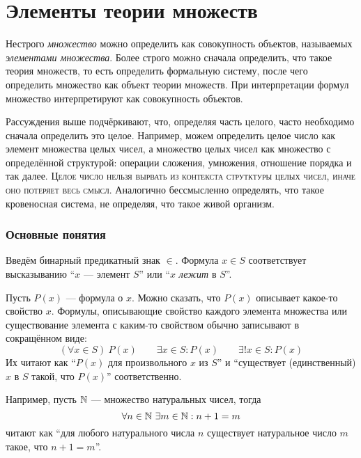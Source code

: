 \part{Элементы теории множеств}

\begin{fullwidth}
  \begin{multicols}{2}
    Нестрого {\it множество} можно определить как совокупность объектов,
    называемых {\it элементами множества}.
    Более строго можно сначала определить, что такое теория множеств, то есть
    определить формальную систему, после чего определить множество как
    объект теории множеств. При интерпретации формул множество интерпретируют
    как совокупность объектов.

    Рассуждения выше подчёркивают, что, определяя часть целого, часто
    необходимо сначала определить это целое. Например, можем определить целое число
    как элемент множества целых чисел, а множество целых чисел как множество
    с определённой структурой: операции сложения, умножения,
    отношение порядка и так далее. \textsc{Целое число нельзя вырвать
      из контекста струтктуры целых чисел, иначе оно потеряет весь смысл.}
    Аналогично бессмысленно определять, что такое кровеносная система,
    не определяя, что такое живой организм.
  \end{multicols}
\end{fullwidth}

\section{Основные понятия}

Введём бинарный предикатный знак $\in$. Формула ${x\in S}$
соответствует высказыванию ``$x$ --- элемент $S$'' или
``$x$ {\it лежит} в $S$''.

Пусть $P(x)$ --- формула о $x$. Можно сказать, что $P(x)$ описывает какое-то
свойство $x$.
Формулы, описывающие свойство каждого элемента множества или
существование элемента с каким-то свойством обычно записывают в сокращённом виде:
\[
  (\forall x\in S)~P(x)\qquad
  \exists x\in S:P(x)\qquad \exists!x\in S:P(x)
\]
Их читают как ``$P(x)$ для произвольного $x$ из $S$'' и
``существует (единственный) $x$ в $S$ такой, что $P(x)$'' соответственно.

Например, пусть $\mathbb N$ --- множество натуральных чисел, тогда
\[
  \forall n\in\mathbb N~\exists m\in\mathbb N:n+1=m
\]
читают как ``для любого натурального числа $n$ существует натуральное число
$m$ такое, что $n+1=m$''.

